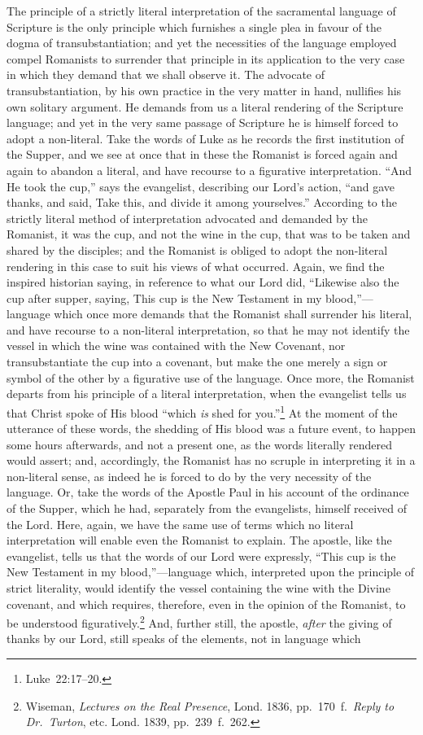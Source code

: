 \documentclass[
]{book}
\begin{document}
The principle of a strictly literal interpretation of the sacramental language of Scripture is the only principle which furnishes a single plea in favour of the dogma of transubstantiation; and yet the necessities of the language employed compel Romanists to surrender that principle in its application to the very case in which they demand that we shall observe it. The advocate of transubstantiation, by his own practice in the very matter in hand, nullifies his own solitary argument. He demands from us a literal rendering of the Scripture language; and yet in the very same passage of Scripture he is himself forced to adopt a non-literal. Take the words of Luke as he records the first institution of the Supper, and we see at once that in these the Romanist is forced again and again to abandon a literal, and have recourse to a figurative interpretation. ``And He took the cup,'' says the evangelist, describing our Lord's action, ``and gave thanks, and said, Take this, and divide it among yourselves.'' According to the strictly literal method of interpretation advocated and demanded by the Romanist, it was the cup, and not the wine in the cup, that was to be taken and shared by the disciples; and the Romanist is obliged to adopt the non-literal rendering in this case to suit his views of what occurred. Again, we find the inspired historian saying, in reference to what our Lord did, ``Likewise also the cup after supper, saying, This cup is the New Testament in my blood,''---language which once more demands that the Romanist shall surrender his literal, and have recourse to a non-literal interpretation, so that he may not identify the vessel in which the wine was contained with the New Covenant, nor transubstantiate the cup into a covenant, but make the one merely a sign or symbol of the other by a figurative use of the language. Once more, the Romanist departs from his principle of a literal interpretation, when the evangelist tells us that Christ spoke of His blood ``which \emph{is} shed for you.''\footnote{Luke~22:17--20.} At the moment of the utterance of these words, the shedding of His blood was a future event, to happen some hours afterwards, and not a present one, as the words literally rendered would assert; and, accordingly, the Romanist has no scruple in interpreting it in a non-literal sense, as indeed he is forced to do by the very necessity of the language. Or, take the words of the Apostle Paul in his account of the ordinance of the Supper, which he had, separately from the evangelists, himself received of the Lord. Here, again, we have the same use of terms which no literal interpretation will enable even the Romanist to explain. The apostle, like the evangelist, tells us that the words of our Lord were expressly, ``This cup is the New Testament in my blood,''---language which, interpreted upon the principle of strict literality, would identify the vessel containing the wine with the Divine covenant, and which requires, therefore, even in the opinion of the Romanist, to be understood figuratively.\footnote{Wiseman, \emph{Lectures on the Real Presence}, Lond. 1836, pp.~170~f.~\emph{Reply to Dr.~Turton}, etc. Lond. 1839, pp.~239~f.~262.} And, further still, the apostle, \emph{after} the giving of thanks by our Lord, still speaks of the elements, not in language which 
\end{document}
